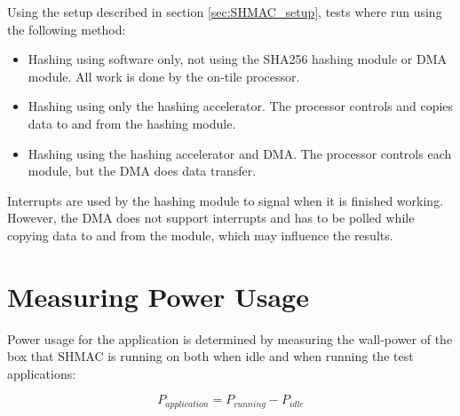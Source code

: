 Using the setup described in section \ref{sec:SHMAC_setup}, tests where run using the
following method:

\begin{itemize}
    \item Hashing using software only, not using the SHA256 hashing module or DMA module.
    All work is done by the on-tile processor.
    \item Hashing using only the hashing accelerator.
    The processor controls and copies data to and from the hashing module.
    \item Hashing using the hashing accelerator and DMA.
    The processor controls each module, but the DMA does data transfer.
\end{itemize}

Interrupts are used by the hashing module to signal when it is finished working. However,
the DMA does not support interrupts and has to be polled while copying data to and from
the module, which may influence the results.

\section{Measuring Power Usage}

Power usage for the application is determined by measuring the wall-power of the box
that SHMAC is running on both when idle and when running the test applications:

\[P_{application} = P_{running} - P_{idle}\]

%

